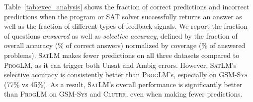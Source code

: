 \documentclass{article}
\theoremstyle{definition}
\newcommand{\greg}[1]{\textcolor{red}{\textbf{GREG:} #1}}
\newcommand{\gsm}{\textsc{GSM}}
\newcommand{\gsmsys}{\textsc{GSM-Sys}}
\newcommand{\clutrr}{\textsc{Clutrr}}
\newcommand{\satlm}{\textsc{SatLM}}
\newcommand{\pallm}{\textsc{ProgLM}}
\begin{document}
    


Table~\ref{tab:exec_analysis} shows the fraction of correct predictions and incorrect predictions when the program or SAT solver successfully returns an answer as well as the fraction of different types of feedback signals. We report the fraction of questions \emph{answered} as well as \emph{selective accuracy}, defined by the fraction of overall accuracy (\% of correct answers) normalized by coverage (\% of answered problems). \satlm{} makes fewer predictions on all three datasets compared to \pallm{}, as it can trigger both {\sc Unsat} and {\sc Ambig} errors. However, \satlm{}'s selective accuracy is consistently better than \pallm{}'s, especially on \gsmsys{} (77\% vs 45\%). As a result, \satlm{}'s overall performance is significantly better than \pallm{} on \gsmsys{} and \clutrr{}, even when making fewer predictions.
\end{document}
